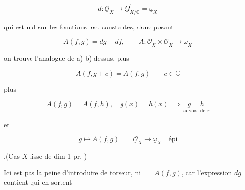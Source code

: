 \[
d:\underline{\mathcal O}_X\longrightarrow\underline\Omega^1_{X/\mathbb C}=\underline\omega_X
\]


qui est  nul  sur les fonctions loc. constantes, donc posant

\[
A(f,g)=dg-df,\qquad A:\underline{\mathcal O}_X\times\underline{\mathcal O}_X\longrightarrow\underline\omega_X
\]

on trouve l'analogue de a) b) dessus, plus

\[
 A(f,g+c)=A(f,g)\qquad c\in\mathbb C
\]

plus

\[
 A(f,g)=A(f,h),\quad g(x)=h(x)\implies \underset{\text{au vois. de }x}{g=h}
\]

et

\[
g\mapsto A(f,g)\qquad \underline{\mathcal O}_X\longrightarrow\underline\omega_X\quad \text{épi}
\]

.(Cas $X$ lisse de dim 1 pr. ) --

Ici est pas la peine d'introduire de torseur,  ni $=$ $A(f,g)$, car l'expression $dg$ contient  qui en sortent
